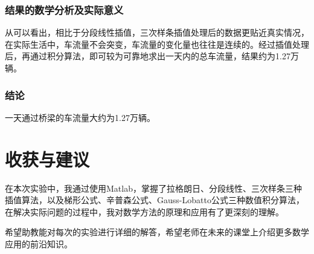 \documentclass[12pt,a4paper]{article}
\begin{document}
\subsubsection{结果的数学分析及实际意义}

从可以看出，相比于分段线性插值，三次样条插值处理后的数据更贴近真实情况，在实际生活中，车流量不会突变，车流量的变化量也往往是连续的。经过插值处理后，再通过积分算法，即可较为可靠地求出一天内的总车流量，结果约为1.27万辆。

\subsubsection{结论}

一天通过桥梁的车流量大约为1.27万辆。

\section{收获与建议}

在本次实验中，我通过使用Matlab，掌握了拉格朗日、分段线性、三次样条三种插值算法，以及梯形公式、辛普森公式、Gauss-Lobatto公式三种数值积分算法，在解决实际问题的过程中，我对数学方法的原理和应用有了更深刻的理解。

希望助教能对每次的实验进行详细的解答，希望老师在未来的课堂上介绍更多数学应用的前沿知识。
\end{document}
